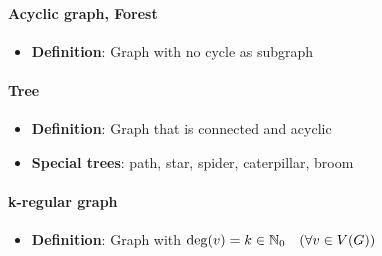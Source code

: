 \paragraph{Acyclic graph, Forest}
\begin{itemize}
  \item \textbf{Definition}: Graph with no cycle as subgraph
\end{itemize}

\paragraph{Tree}
\begin{itemize}
  \item \textbf{Definition}: Graph that is connected and acyclic
  \item \textbf{Special trees}: path, star, spider, caterpillar, broom
\end{itemize}

\paragraph{k-regular graph}
\begin{itemize}
  \item \textbf{Definition}: Graph with $ \deg(v) = k \in \mathbb{N}_0 \quad (\forall v \in V(G)) $
\end{itemize}





